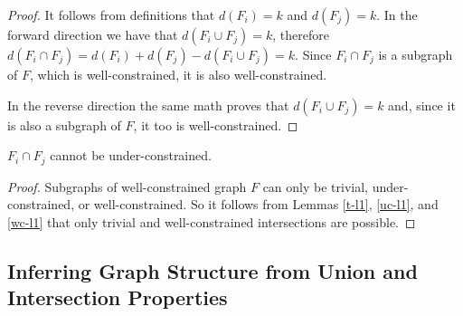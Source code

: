 \begin{proof}
It follows from definitions that $d(F_i)=k$ and $d(F_j)=k$. In the forward direction we have that $d(F_i\cup F_j)=k$, therefore $d(F_i\cap F_j)=d(F_i)+d(F_j)-d(F_i\cup F_j)=k$. Since $F_i\cap F_j$ is a subgraph of $F$, which is well-constrained, it is also well-constrained.

In the reverse direction the same math proves that $d(F_i\cup F_j)=k$ and, since it is also a subgraph of $F$, it too is well-constrained.



\end{proof}


\begin{lemma}\label{iuc-l1}
$F_i\cap F_j$ cannot be under-constrained.
\end{lemma}

\begin{proof}
Subgraphs of well-constrained graph $F$ can only be trivial, under-constrained, or well-constrained. So it follows from Lemmas \ref{t-l1}, \ref{uc-l1}, and \ref{wc-l1} that only trivial and well-constrained intersections are possible.
\end{proof}






\subsection{Inferring Graph Structure from Union and Intersection Properties}



